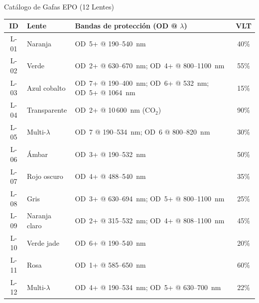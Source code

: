 \documentclass[aspectratio=169,12pt]{beamer}
\begin{document}
\begin{frame}{Catálogo de Gafas EPO (12 Lentes)}
	\centering
	\tiny
	\begin{tabular}{cllc}
		\toprule
		\textbf{ID} & \textbf{Lente}  & \textbf{Bandas de protección (OD @ $\lambda$)}       & \textbf{VLT} \\
		\midrule
		L-01        & Naranja         & OD~5+ @ 190--540~nm                                  & 40\%         \\
		L-02        & Verde           & OD~2+ @ 630--670~nm; OD~4+ @ 800--1100~nm            & 55\%         \\
		L-03        & Azul cobalto    & OD~7+ @ 190--400~nm; OD~6+ @ 532~nm; OD~5+ @ 1064~nm & 15\%         \\
		L-04        & Transparente    & OD~2+ @ 10\,600~nm (CO$_2$)                          & 90\%         \\
		L-05        & Multi-$\lambda$ & OD~7 @ 190--534~nm; OD~6 @ 800--820~nm               & 30\%         \\
		L-06        & Ámbar           & OD~3+ @ 190--532~nm                                  & 50\%         \\
		L-07        & Rojo oscuro     & OD~4+ @ 488--540~nm                                  & 35\%         \\
		L-08        & Gris            & OD~3+ @ 630--694~nm; OD~5+ @ 800--1100~nm            & 25\%         \\
		L-09        & Naranja claro   & OD~2+ @ 315--532~nm; OD~4+ @ 808--1100~nm            & 45\%         \\
		L-10        & Verde jade      & OD~6+ @ 190--540~nm                                  & 20\%         \\
		L-11        & Rosa            & OD~1+ @ 585--650~nm                                  & 60\%         \\
		L-12        & Multi-$\lambda$ & OD~4+ @ 190--534~nm; OD~5+ @ 630--700~nm             & 22\%         \\
		\bottomrule
	\end{tabular}
\end{frame}
\end{document}
